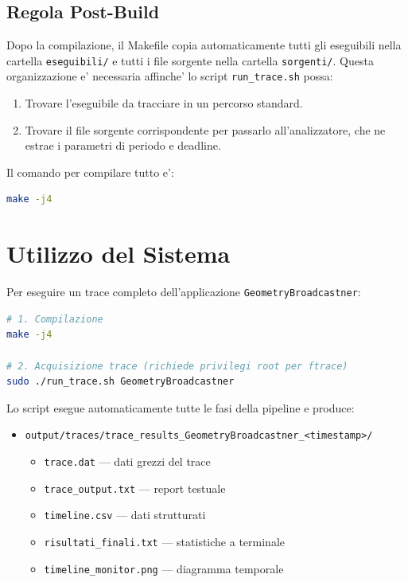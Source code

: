 \subsection{Regola Post-Build}
\label{subsec:postbuild}

Dopo la compilazione, il Makefile copia automaticamente tutti gli
eseguibili nella cartella \texttt{eseguibili/} e tutti i file sorgente
nella cartella \texttt{sorgenti/}. Questa organizzazione e' necessaria
affinche' lo script \texttt{run\_trace.sh} possa:

\begin{enumerate}
    \item Trovare l'eseguibile da tracciare in un percorso standard.
    \item Trovare il file sorgente corrispondente per passarlo
          all'analizzatore, che ne estrae i parametri di periodo e deadline.
\end{enumerate}

Il comando per compilare tutto e':
\begin{lstlisting}[language=bash]
make -j4
\end{lstlisting}


\section{Utilizzo del Sistema}
\label{sec:utilizzo}

Per eseguire un trace completo dell'applicazione \texttt{GeometryBroadcastner}:

\begin{lstlisting}[language=bash]
# 1. Compilazione
make -j4

# 2. Acquisizione trace (richiede privilegi root per ftrace)
sudo ./run_trace.sh GeometryBroadcastner
\end{lstlisting}

Lo script esegue automaticamente tutte le fasi della pipeline e produce:
\begin{itemize}
    \item \texttt{output/traces/trace\_results\_GeometryBroadcastner\_<timestamp>/}
    \begin{itemize}
        \item \texttt{trace.dat} --- dati grezzi del trace
        \item \texttt{trace\_output.txt} --- report testuale
        \item \texttt{timeline.csv} --- dati strutturati
        \item \texttt{risultati\_finali.txt} --- statistiche a terminale
        \item \texttt{timeline\_monitor.png} --- diagramma temporale
    \end{itemize}
\end{itemize}

